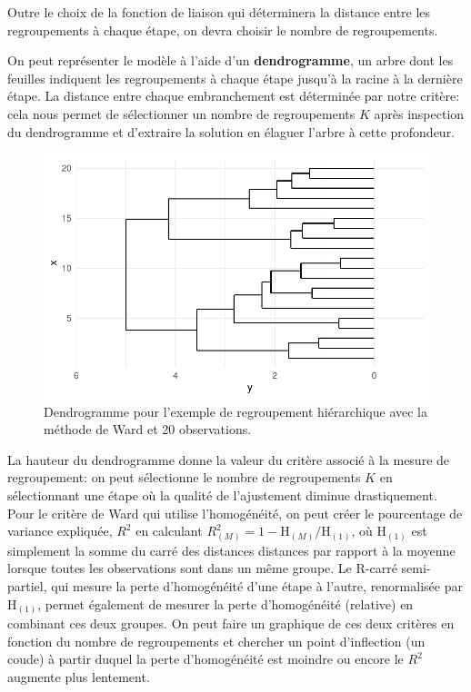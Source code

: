 \documentclass[
  11pt,
  letterpaper,
]{scrbook}
\theoremstyle{definition}
\theoremstyle{remark}
\begin{document}
Outre le choix de la fonction de liaison qui déterminera la distance
entre les regroupements à chaque étape, on devra choisir le nombre de
regroupements.

On peut représenter le modèle à l'aide d'un \textbf{dendrogramme}, un
arbre dont les feuilles indiquent les regroupements à chaque étape
jusqu'à la racine à la dernière étape. La distance entre chaque
embranchement est déterminée par notre critère: cela nous permet de
sélectionner un nombre de regroupements \(K\) après inspection du
dendrogramme et d'extraire la solution en élaguer l'arbre à cette
profondeur.

\begin{figure}[ht!]

{\centering \includegraphics{regroupements_files/figure-pdf/fig-dendrogramme-1.pdf}

}

\caption{\label{fig-dendrogramme}Dendrogramme pour l'exemple de
regroupement hiérarchique avec la méthode de Ward et 20 observations.}

\end{figure}

La hauteur du dendrogramme donne la valeur du critère associé à la
mesure de regroupement: on peut sélectionne le nombre de regroupements
\(K\) en sélectionnant une étape où la qualité de l'ajustement diminue
drastiquement. Pour le critère de Ward qui utilise l'homogénéité, on
peut créer le pourcentage de variance expliquée, \(R^2\) en calculant
\(R^2_{(M)} = 1-\mathrm{H}_{(M)}/\mathrm{H}_{(1)}\), où
\(\mathrm{H}_{(1)}\) est simplement la somme du carré des distances
distances par rapport à la moyenne lorsque toutes les observations sont
dans un même groupe. Le R-carré semi-partiel, qui mesure la perte
d'homogénéité d'une étape à l'autre, renormalisée par
\(\mathrm{H}_{(1)}\), permet également de mesurer la perte d'homogénéité
(relative) en combinant ces deux groupes. On peut faire un graphique de
ces deux critères en fonction du nombre de regroupements et chercher un
point d'inflection (un coude) à partir duquel la perte d'homogénéité est
moindre ou encore le \(R^2\) augmente plus lentement.
\end{document}
